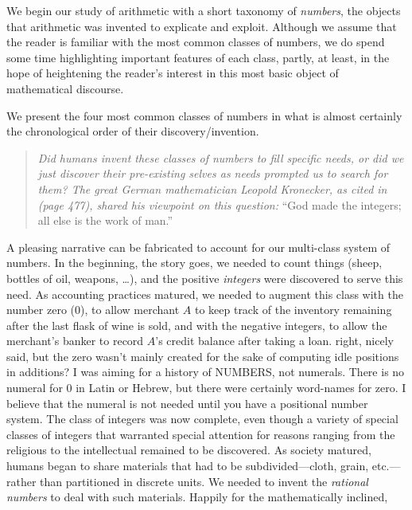 We begin our study of arithmetic with a short taxonomy of {\it
  numbers}, the objects that arithmetic was invented to explicate and
exploit.  Although we assume that the reader is familiar with the most
common classes of numbers, we do spend some time highlighting
important features of each class, partly, at least, in the hope of
heightening the reader's interest in this most basic object of
mathematical discourse.

We present the four most common classes of numbers in what is almost
certainly the chronological order of their discovery/invention.
\begin{quote}
{\em Did humans {\em invent} these classes of numbers to fill specific
  needs, or did we just {\em discover} their pre-existing selves as
  needs prompted us to search for them?  The great German
  mathematician Leopold Kronecker,
as cited in \cite{Bell86} (page 477), shared his viewpoint on this
question:} ``God made the integers; all else is the work of man.''
\end{quote}
A pleasing narrative can be fabricated to account for our multi-class
system of numbers.  In the beginning, the story goes, we needed to
count things (sheep, bottles of oil, weapons, \ldots), and the
positive {\it integers} were discovered to serve
this need.  As accounting practices matured, we needed to augment this
class with the number zero  ($0$), to allow
merchant $A$ to keep track of the inventory remaining after the last
flask of wine is sold, and with the negative integers,
 to allow the merchant's banker to record $A$'s
credit balance after taking a loan.  
%
{\Denis right, nicely said, but the zero wasn't mainly created for the
  sake of computing idle positions in additions?}  {\Arny I was aiming
  for a history of NUMBERS, not numerals.  There is no numeral for 0
  in Latin or Hebrew, but there were certainly word-names for zero.  I
  believe that the numeral is not needed until you have a positional
  number system.}
% 
The class of integers was now complete, even though a variety of
special classes of integers that warranted special attention for
reasons ranging from the religious to the intellectual remained to be
discovered.  As society matured, humans began to share materials that
had to be subdivided---cloth, grain, etc.---rather than partitioned in
discrete units.  We needed to invent the {\it rational numbers}
%
to deal with such materials.  Happily for the mathematically inclined,
